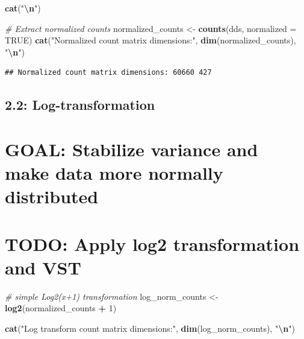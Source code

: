 \documentclass[
]{article}
\newenvironment{Shaded}{\begin{snugshade}}{\end{snugshade}}
\newcommand{\AttributeTok}[1]{\textcolor[rgb]{0.13,0.29,0.53}{#1}}
\newcommand{\CommentTok}[1]{\textcolor[rgb]{0.56,0.35,0.01}{\textit{#1}}}
\newcommand{\ConstantTok}[1]{\textcolor[rgb]{0.56,0.35,0.01}{#1}}
\newcommand{\DecValTok}[1]{\textcolor[rgb]{0.00,0.00,0.81}{#1}}
\newcommand{\FunctionTok}[1]{\textcolor[rgb]{0.13,0.29,0.53}{\textbf{#1}}}
\newcommand{\NormalTok}[1]{#1}
\newcommand{\OtherTok}[1]{\textcolor[rgb]{0.56,0.35,0.01}{#1}}
\newcommand{\SpecialCharTok}[1]{\textcolor[rgb]{0.81,0.36,0.00}{\textbf{#1}}}
\newcommand{\StringTok}[1]{\textcolor[rgb]{0.31,0.60,0.02}{#1}}
\begin{document}
\begin{Shaded}
\begin{Highlighting}[]
\FunctionTok{cat}\NormalTok{(}\StringTok{"}\SpecialCharTok{\textbackslash{}n}\StringTok{"}\NormalTok{)}
\end{Highlighting}
\end{Shaded}

\begin{Shaded}
\begin{Highlighting}[]
\CommentTok{\# Extract normalized counts}
\NormalTok{normalized\_counts }\OtherTok{\textless{}{-}} \FunctionTok{counts}\NormalTok{(dds, }\AttributeTok{normalized =} \ConstantTok{TRUE}\NormalTok{)}
\FunctionTok{cat}\NormalTok{(}\StringTok{"Normalized count matrix dimensions:"}\NormalTok{, }\FunctionTok{dim}\NormalTok{(normalized\_counts), }\StringTok{"}\SpecialCharTok{\textbackslash{}n}\StringTok{"}\NormalTok{)}
\end{Highlighting}
\end{Shaded}

\begin{verbatim}
## Normalized count matrix dimensions: 60660 427
\end{verbatim}

\subsection{2.2: Log-transformation}\label{log-transformation}

\section{GOAL: Stabilize variance and make data more normally
distributed}\label{goal-stabilize-variance-and-make-data-more-normally-distributed}

\section{TODO: Apply log2 transformation and
VST}\label{todo-apply-log2-transformation-and-vst}

\begin{Shaded}
\begin{Highlighting}[]
\CommentTok{\# simple Log2(x+1) transformation }
\NormalTok{log\_norm\_counts }\OtherTok{\textless{}{-}} \FunctionTok{log2}\NormalTok{(normalized\_counts }\SpecialCharTok{+} \DecValTok{1}\NormalTok{)}

\FunctionTok{cat}\NormalTok{(}\StringTok{"Log transform count matrix dimensions:"}\NormalTok{, }\FunctionTok{dim}\NormalTok{(log\_norm\_counts), }\StringTok{"}\SpecialCharTok{\textbackslash{}n}\StringTok{"}\NormalTok{)}
\end{Highlighting}
\end{Shaded}
\end{document}
